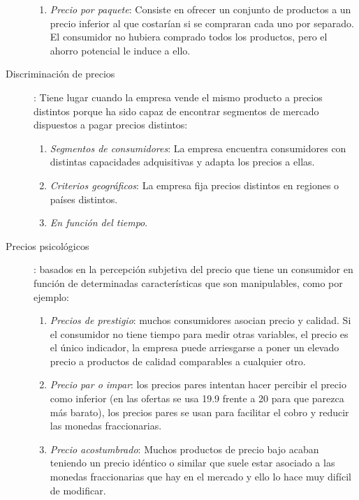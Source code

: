 \documentclass[10pt,a4paper,spanish]{report}
\begin{document}
\begin{description}
\begin{enumerate}
					\item \textit{\textcolor[rgb]{0.1,0.2,0.4}{Precio por paquete}}: Consiste en ofrecer un conjunto de productos a un precio inferior al que costarían si se compraran cada uno por separado. El consumidor no hubiera comprado todos los productos, pero el ahorro potencial le induce a ello.
				\end{enumerate}
				\item[Discriminación de precios]: Tiene lugar cuando la empresa vende el mismo producto a precios distintos porque ha sido capaz de encontrar segmentos de mercado dispuestos a pagar precios distintos:
				\begin{enumerate}
					\item \textit{\textcolor[rgb]{0.1,0.2,0.4}{Segmentos de consumidores}}: La empresa encuentra consumidores con distintas capacidades adquisitivas y adapta los precios a ellas.
					\item \textit{\textcolor[rgb]{0.1,0.2,0.4}{Criterios geográficos}}: La empresa fija precios distintos en regiones o países distintos.
					\item \textit{\textcolor[rgb]{0.1,0.2,0.4}{En función del tiempo}}.
				\end{enumerate}
				\item[Precios psicológicos]: basados en la percepción subjetiva del precio que tiene un consumidor en función de determinadas características que son manipulables, como por ejemplo:
				\begin{enumerate}
					\item \textit{\textcolor[rgb]{0.1,0.2,0.4}{Precios de prestigio}}: muchos consumidores asocian precio y calidad. Si el consumidor no tiene tiempo para medir otras variables, el precio es el único indicador, la empresa puede arriesgarse a poner un elevado precio a productos de calidad comparables a cualquier otro.
					\item \textit{\textcolor[rgb]{0.1,0.2,0.4}{Precio par o impar}}: los precios pares intentan hacer percibir el precio como inferior (en las ofertas se usa 19.9 frente a 20 para que parezca más barato), los precios pares se usan para facilitar el cobro y reducir las monedas fraccionarias.
					\item \textit{\textcolor[rgb]{0.1,0.2,0.4}{Precio acostumbrado}}: Muchos productos de precio bajo acaban teniendo un precio idéntico o similar que suele estar asociado a las monedas fraccionarias que hay en el mercado y ello lo hace muy difícil de modificar.
				\end{enumerate}
			\end{description}
\end{document}
